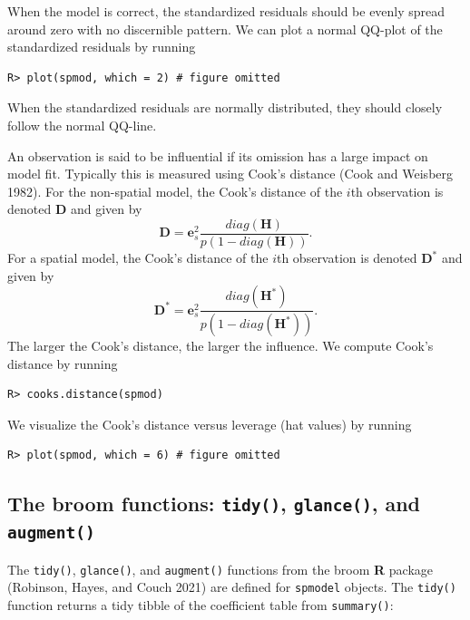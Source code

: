 \documentclass{article}
\begin{document}
When the model is correct, the standardized residuals should be evenly
spread around zero with no discernible pattern. We can plot a normal
QQ-plot of the standardized residuals by running

\begin{verbatim}
R> plot(spmod, which = 2) # figure omitted
\end{verbatim}

When the standardized residuals are normally distributed, they should
closely follow the normal QQ-line.

An observation is said to be influential if its omission has a large
impact on model fit. Typically this is measured using Cook's distance
(Cook and Weisberg 1982). For the non-spatial model, the Cook's distance
of the \(i\)th observation is denoted \(\mathbf{D}\) and given by
\begin{equation*}
  \mathbf{D} = \mathbf{e}_{s}^2 \frac{diag(\mathbf{H})}{p(1 - diag(\mathbf{H}))} .
\end{equation*} For a spatial model, the Cook's distance of the \(i\)th
observation is denoted \(\mathbf{D}^*\) and given by \begin{equation*}
  \mathbf{D}^* = \mathbf{e}_{s}^2 \frac{diag(\mathbf{H}^*)}{p(1 - diag(\mathbf{H}^*))} .
\end{equation*} The larger the Cook's distance, the larger the
influence. We compute Cook's distance by running

\begin{verbatim}
R> cooks.distance(spmod)
\end{verbatim}

We visualize the Cook's distance versus leverage (hat values) by running

\begin{verbatim}
R> plot(spmod, which = 6) # figure omitted
\end{verbatim}

\hypertarget{the-broom-functions-tidy-glance-and-augment}{%
\subsection{\texorpdfstring{The broom functions: \texttt{tidy()},
\texttt{glance()}, and
\texttt{augment()}}{The broom functions: tidy(), glance(), and augment()}}\label{the-broom-functions-tidy-glance-and-augment}}

The \texttt{tidy()}, \texttt{glance()}, and \texttt{augment()} functions
from the broom \textbf{\textsf{R}} package (Robinson, Hayes, and Couch
2021) are defined for \texttt{spmodel} objects. The \texttt{tidy()}
function returns a tidy tibble of the coefficient table from
\texttt{summary()}:
\end{document}
